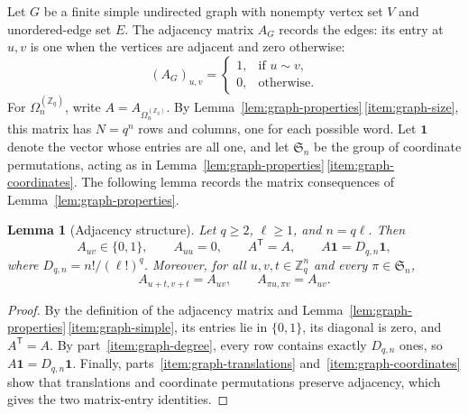\documentclass[11pt,a4paper]{article}
\numberwithin{equation}{section}
\numberwithin{figure}{section}
\numberwithin{table}{section}
\numberwithin{footnote}{section}
\newtheorem{lemma}[theorem]{Lemma}
\theoremstyle{informal}\newtheorem*{informaltheorem}{Informal theorem}
\theoremstyle{definition}\newtheorem{example}{Example}[section]
\theoremstyle{remark}\newtheorem{remark}[theorem]{Remark}
\newcommand{\Z}{\mathbb Z}
\newcommand{\one}{\mathbf 1}
\newcommand{\Om}{\Omega_n^{(\Z_q)}}
\begin{document}
Let \(G\) be a finite simple undirected graph with nonempty vertex
set \(V\) and unordered-edge set \(E\). The adjacency matrix \(A_G\) records the edges: its entry at \(u,v\)
is one when the vertices are adjacent and zero otherwise:
\begin{equation}
 (A_G)_{u,v}=\begin{cases}
  1, & \text{if }u\sim v,\\
  0, & \text{otherwise.}
 \end{cases}
\end{equation}
For \(\Om\), write \(A=A_{\Om}\). By
Lemma~\ref{lem:graph-properties}\,\ref{item:graph-size}, this matrix has
\(N=q^n\) rows and columns, one for each possible word.
Let \(\one\) denote the vector whose entries are all one, and let
\(\mathfrak S_n\) be the group of coordinate permutations, acting as
in Lemma~\ref{lem:graph-properties}\,\ref{item:graph-coordinates}.
The following lemma records the matrix consequences of
Lemma~\ref{lem:graph-properties}.

\begin{lemma}[Adjacency structure]\label{lem:adjacency-structure}
Let \(q\geq2\), \(\ell\geq1\), and \(n=q\ell\). Then
\begin{equation}\label{eq:adjacency-structure}
 A_{uv}\in\{0,1\},\qquad A_{uu}=0,\qquad
 A^{\mathsf T}=A,\qquad A\one=D_{q,n}\one,
\end{equation}
where \(D_{q,n}=n!/(\ell!)^q\). Moreover, for all
\(u,v,t\in\Z_q^n\) and every \(\pi\in\mathfrak S_n\),
\begin{equation}\label{eq:adjacency-symmetries}
 A_{u+t,v+t}=A_{uv},\qquad A_{\pi u,\pi v}=A_{uv}.
\end{equation}
\end{lemma}
\begin{proof}
By the definition of the adjacency matrix and
Lemma~\ref{lem:graph-properties}\,\ref{item:graph-simple}, its entries
lie in \(\{0,1\}\), its diagonal is zero, and \(A^{\mathsf T}=A\).
By part~\ref{item:graph-degree}, every row contains exactly
\(D_{q,n}\) ones, so \(A\one=D_{q,n}\one\).
Finally, parts~\ref{item:graph-translations} and~\ref{item:graph-coordinates}
show that translations and coordinate permutations preserve adjacency,
which gives the two matrix-entry identities.
\end{proof}
\end{document}
